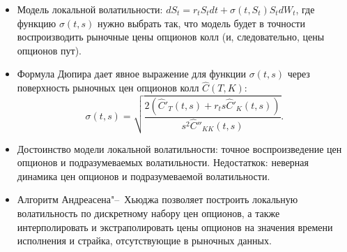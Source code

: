 \summary
\begin{itemize}
\item Модель локальной волатильности: $d S_t = r_tS_t dt + \sigma(t,S_t)S_t d W_t$, где функцию $\sigma(t,s)$ нужно выбрать так, что модель будет в точности воспроизводить рыночные цены опционов колл (и, следовательно, цены опционов пут).

\item Формула Дюпира дает явное выражение для функции $\sigma(t,s)$ через поверхность рыночных цен опционов колл $\hat C(T,K)$:
\[
\sigma(t,s) = \sqrt{\frac{2(\hat C'_T(t,s) + r_ts\hat C'_K(t,s))}{s^2\hat C''_{KK}(t,s)}}.
\]

\item Достоинство модели локальной волатильности: точное воспроизведение цен опционов и подразумеваемых волатильности.
Недостаткок: неверная динамика цен опционов и подразумеваемой волатильности.

\item Алгоритм Андреасена"--~Хьюджа позволяет построить локальную волатильность по дискретному набору цен опционов, а также интерполировать и экстраполировать цены опционов на значения времени исполнения и страйка, отсутствующие в рыночных данных.
\end{itemize}
